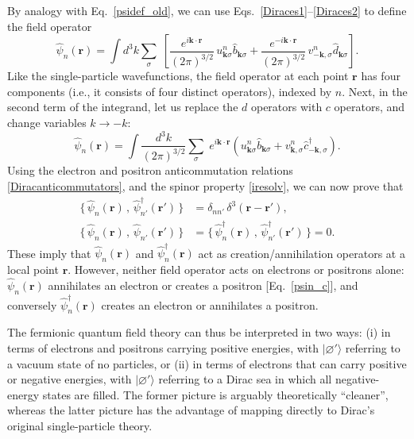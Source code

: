 \documentclass[prx,12pt]{revtex4-2}
\begin{document}
By analogy with Eq.~\eqref{psidef_old}, we can use
Eqs.~\eqref{Diraces1}--\eqref{Diraces2} to define the field operator
\begin{equation}
  \hat{\psi}_n(\mathbf{r})
  = \int d^3k \sum_\sigma \;
  \left[
    \frac{e^{i\mathbf{k}\cdot \mathbf{r}}}{(2\pi)^{3/2}} \, u_{\mathbf{k}\sigma}^n
    \hat{b}_{\mathbf{k}\sigma}
    +
    \frac{e^{-i\mathbf{k}\cdot \mathbf{r}}}{(2\pi)^{3/2}} \, v_{-\mathbf{k},\sigma}^n
    \hat{d}_{\mathbf{k}\sigma}
    \right].
  \label{psin_d}
\end{equation}
Like the single-particle wavefunctions, the field operator at each
point $\mathbf{r}$ has four components (i.e., it consists of four
distinct operators), indexed by $n$.  Next, in the second term of the
integrand, let us replace the $d$ operators with $c$ operators, and
change variables $k\rightarrow-k$:
\begin{equation}
  \hat{\psi}_n(\mathbf{r})
  = \int \frac{d^3k}{(2\pi)^{3/2}} \sum_\sigma \;
  e^{i\mathbf{k}\cdot \mathbf{r}}
  \left( u_{\mathbf{k}\sigma}^n \hat{b}_{\mathbf{k}\sigma}
    + v_{\mathbf{k},\sigma}^n \hat{c}_{-\mathbf{k},\sigma}^\dagger
    \right).
  \label{psin_c}
\end{equation}
Using the electron and positron anticommutation relations
\eqref{Diracanticommutators}, and the spinor property \eqref{iresolv},
we can now prove that
\begin{align}
  \Big\{\, \hat{\psi}_n(\mathbf{r}) \,,\,
  \hat{\psi}_{n'}^{\dagger}(\mathbf{r}')\, \Big\}
  &= \delta_{nn'}\, \delta^3(\mathbf{r}-\mathbf{r}'), \\
  \Big\{\, \hat{\psi}_n(\mathbf{r}) \,,\, \hat{\psi}_{n'}(\mathbf{r}')\,\Big\}
  &= \Big\{\,\hat{\psi}_n^{\dagger}(\mathbf{r}) \,,\,
  \hat{\psi}_{n'}^{\dagger}(\mathbf{r}')\,\Big\} = 0.  
\end{align}
These imply that $\hat{\psi}_n(\mathbf{r})$ and
$\hat{\psi}_n^\dagger(\mathbf{r})$ act as creation/annihilation
operators at a local point $\mathbf{r}$.  However, neither field
operator acts on electrons or positrons alone:
$\hat{\psi}_n(\mathbf{r})$ annihilates an electron or creates a
positron [Eq.~\eqref{psin_c}], and conversely
$\hat{\psi}_n^\dagger(\mathbf{r})$ creates an electron or annihilates
a positron.

The fermionic quantum field theory can thus be interpreted in two
ways: (i) in terms of electrons and positrons carrying positive
energies, with $|\varnothing'\rangle$ referring to a vacuum state of
no particles, or (ii) in terms of electrons that can carry positive or
negative energies, with $|\varnothing'\rangle$ referring to a Dirac
sea in which all negative-energy states are filled.  The former
picture is arguably theoretically ``cleaner'', whereas the latter
picture has the advantage of mapping directly to Dirac's original
single-particle theory.
\end{document}
